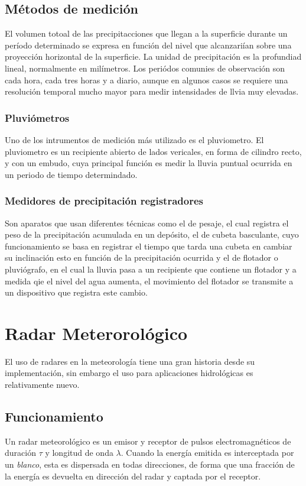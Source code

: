 \documentclass[letterpaper,12pt,oneside]{book}
\begin{document}
    \section{Métodos de medición}
        El volumen totoal de las precipitacciones que llegan a la superficie durante un período determinado se expresa en función del nivel que alcanzariían sobre una proyección horizontal de la superficie. La unidad de precipitación es la profundiad lineal, normalmente en milímetros. Los periódos comunies de observación son cada hora, cada tres horas y a diario, aunque en algunos casos se requiere una resolución temporal mucho mayor para medir intensidades de llvia muy elevadas.
        \subsection{Pluviómetros}
            Uno de los intrumentos de medición más utilizado es el pluviometro. El pluviometro es un recipiente abierto de lados vericales, en forma de cilindro recto, y con un embudo, cuya principal función es medir la lluvia puntual ocurrida en un periodo de tiempo determindado.
        \subsection{Medidores de precipitación registradores}
            Son aparatos que usan diferentes técnicas como el de pesaje, el cual registra el peso de la precipitación acumulada en un depósito, el de cubeta basculante, cuyo funcionamiento se basa en registrar el tiempo que tarda una cubeta en cambiar su inclinación esto en función de la precipitación ocurrida y el de flotador o pluviógrafo, en el cual la lluvia pasa a un recipiente que contiene un flotador y a medida qie el nivel del agua aumenta, el movimiento del flotador se transmite a un dispositivo que registra este cambio.

\chapter{Radar Meterorológico}
    El uso de radares en la meteorología tiene una gran historia desde su implementación, sin embargo el uso para aplicaciones hidrológicas es relativamente nuevo.
    \section{Funcionamiento}
        Un radar meteorológico es un emisor y receptor de pulsos electromagnéticos de duración $\tau$ y longitud de onda $\lambda$. 
        Cuando la energía emitida es interceptada por un \textit{blanco}, esta es dispersada en todas direcciones, de forma que una fracción de la energía es devuelta en dirección del radar y captada por el receptor. 
\end{document}
